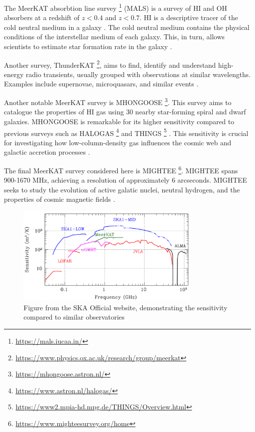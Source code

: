 \documentclass[preprint,linenumbers, longauthor]{aastex631}
\begin{document}
The MeerKAT absorbtion line survey \footnote{\url{https://mals.iucaa.in/}} (MALS) is a survey of HI and OH absorbers at a redshift of $z < 0.4$ and $z < 0.7$. 
HI is a descriptive tracer of the cold neutral medium in a galaxy \citep{guptaBlindOHAbsorption2021}. 
The cold neutral medium contains the physical conditions of the interstellar medium of each galaxy. This, in turn, allows scientists to estimate star formation rate in the galaxy \citep{guptaBlindOHAbsorption2021}.

Another survey, ThunderKAT \footnote{\url{https://www.physics.ox.ac.uk/research/group/meerkat}}, aims to find, identify and understand high-energy radio transients, usually grouped with observations at similar wavelengths.
Examples include supernovae, microquasars, and similar events \citep{woudtThunderKATMeerKATLarge2018}.

Another notable MeerKAT survey is MHONGOOSE \footnote{\url{https://mhongoose.astron.nl/}}. This survey aims to catalogue the properties of HI gas using 30 nearby star-forming spiral and dwarf galaxies. 
MHONGOOSE is remarkable for its higher sensitivity compared to previous surveys such as HALOGAS \footnote{\url{https://www.astron.nl/halogas/}} and THINGS \footnote{\url{https://www2.mpia-hd.mpg.de/THINGS/Overview.html}} \citep{deblokMHONGOOSEMeerKATNearby2024}. 
This sensitivity is crucial for investigating how low-column-density gas influences the cosmic web and galactic accretion processes \citep{deblokMHONGOOSEMeerKATNearby2024}.

The final MeerKAT survey considered here is MIGHTEE \footnote{\url{https://www.mighteesurvey.org/home}}. MIGHTEE spans 900-1670 MHz, achieving a resolution of approximately 6 arcseconds. MIGHTEE seeks to study the evolution of active galatic nuclei, neutral hydrogen, and the properties of cosmic magnetic fields \citep{MIGHTEESurvey}.

\begin{figure}[h!]
  \centering
  \includegraphics[width=0.8\textwidth]{SKA_Graph.png}
  \caption{Figure from the SKA Official website, demonstrating the sensitivity compared to similar observatories}
  \label{fig:SKA_Graph}
\end{figure}
\end{document}
